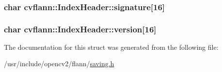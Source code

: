 \hypertarget{structcvflann_1_1IndexHeader_a03d7179b97511bb054a8f3b48f0bb665}{
\subsubsection[{signature}]{\setlength{\rightskip}{0pt plus 5cm}char cvflann\-::\-Index\-Header\-::signature\mbox{[}16\mbox{]}}}\label{structcvflann_1_1IndexHeader_a03d7179b97511bb054a8f3b48f0bb665}
\hypertarget{structcvflann_1_1IndexHeader_ae7913274085c6b7bd9e5e2ac3c833426}{
\subsubsection[{version}]{\setlength{\rightskip}{0pt plus 5cm}char cvflann\-::\-Index\-Header\-::version\mbox{[}16\mbox{]}}}\label{structcvflann_1_1IndexHeader_ae7913274085c6b7bd9e5e2ac3c833426}


The documentation for this struct was generated from the following file\-:\begin{DoxyCompactItemize}
\item 
/usr/include/opencv2/flann/\hyperlink{saving_8h}{saving.\-h}\end{DoxyCompactItemize}
